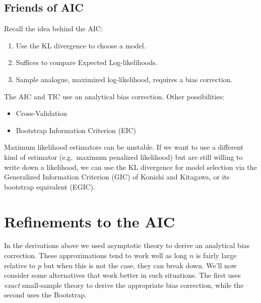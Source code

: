 \documentclass[12pt]{article}
\theoremstyle{definition}
\begin{document}
\subsection{Friends of AIC}
Recall the idea behind the AIC:
	\begin{enumerate}
		\item Use the KL divergence to choose a model.
		\item Suffices to compare Expected Log-likelihoods. 
		\item Sample analogue, maximized log-likelihood, requires a bias correction.
	\end{enumerate}
The AIC and TIC use an analytical bias correction. Other possibilities:
	\begin{itemize}
		\item Cross-Validation
		\item Bootstrap Information Criterion (EIC)
	\end{itemize}
Maximum likelihood estimators can be unstable. If we want to use a different kind of estimator (e.g.\ maximum penalized likelihood) but are still willing to write down a likelihood, we can use the KL divergence for model selection via the Generalized Information Criterion (GIC) of Konishi and Kitagawa, or its bootstrap equivalent (EGIC).

\section{Refinements to the AIC}
In the derivations above we used asymptotic theory to derive an analytical bias correction. These approximations tend to work well as long $n$ is fairly large relative to $p$ but when this is not the case, they can break down. We'll now consider some alternatives that work better in such situations. The first uses \emph{exact} small-sample theory to derive the appropriate bias correction, while the second uses the Bootstrap.
\end{document}
